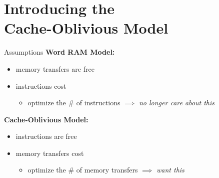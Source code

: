 \documentclass[aspectratio=169, xcolor=dvipsnames]{beamer}
\begin{document}
\section{Introducing the \\Cache-Oblivious Model}

\begin{frame}{Assumptions}
    \textbf{Word RAM Model:}
    \begin{itemize}
        \item memory transfers are free
        \item instructions cost
        \begin{itemize}
            \item optimize the \# of instructions $\implies$ \textit{no longer care about this}
        \end{itemize}
    \end{itemize}
    \textbf{Cache-Oblivious Model:}
    \begin{itemize}
        \item instructions are free
        \item memory transfers cost
        \begin{itemize}
            \item optimize the \# of memory transfers $\implies$ \textit{want this}
        \end{itemize}
    \end{itemize}
\end{frame}
\end{document}
